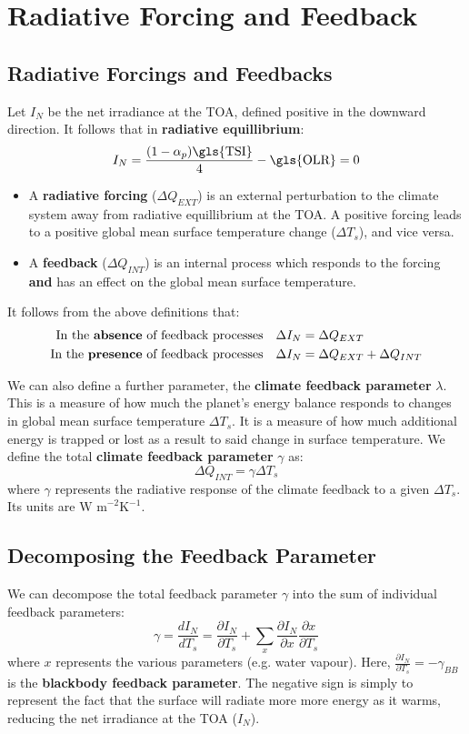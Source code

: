 \section{Radiative Forcing and Feedback}
\label{sec:forcing_feedback}
\subsection{Radiative Forcings and Feedbacks}
Let $I_N$ be the net irradiance at the \gls{TOA}, defined positive in the downward direction. It
follows that in \textbf{radiative equillibrium}:
$$
I_N = \frac{(1 - \alpha_p) \text{\gls{TSI}}}{4} - \text{\gls{OLR}} = 0
$$

\begin{itemize}
    \item A \textbf{radiative forcing} ($\Delta Q_{EXT}$) is an external perturbation to the climate system away from 
radiative equillibrium at the \gls{TOA}. A positive forcing leads to a positive global mean surface temperature
change ($\Delta T_s$), and vice versa.
    \item A \textbf{feedback} ($\Delta Q_{INT}$) is an internal process which responds to the forcing \textbf{and} has an
    effect on the global mean surface temperature.
\end{itemize}

\noindent It follows from the above definitions that:
\begin{align}
    \text{In the \textbf{absence} of feedback processes} \quad \Delta I_N &= \Delta Q_{EXT} \nonumber \\
    \text{In the \textbf{presence} of feedback processes} \quad \Delta I_N &= \Delta Q_{EXT} + \Delta Q_{INT} \nonumber
\end{align}

We can also define a further parameter, the \textbf{climate feedback parameter} $\lambda$. This is a measure 
of how much the planet's energy balance responds to changes in global mean surface temperature $\Delta T_s$. It is a
measure of how much additional energy is trapped or lost as a result to said change in surface temperature. We define
the total \textbf{climate feedback parameter} $\gamma$ as:
$$
\Delta Q_{INT} = \gamma \Delta T_s \label{eq:gamma}
$$
where $\gamma$ represents the radiative response of the climate feedback to a given $\Delta T_s$. Its units are 
$\text{W m}^{-2} \text{K}^{-1}$.

\subsection{Decomposing the Feedback Parameter}
\label{sec:decompose_feedback}
We can decompose the total feedback parameter $\gamma$ into the sum of individual feedback parameters:
$$
\gamma = \frac{dI_N}{dT_s} = \frac{\partial I_N}{\partial T_s} + \sum_x \frac{\partial I_N}{\partial x} 
\frac{\partial x}{\partial T_s}
$$
where $x$ represents the various parameters (e.g. water vapour). Here, $\frac{\partial I_N}{\partial T_s} = -\gamma_{BB}$
is the \textbf{blackbody feedback parameter}. The negative sign is simply to represent the fact that the surface will 
radiate more more energy as it warms, reducing the net irradiance at the \gls{TOA} ($I_N$).

